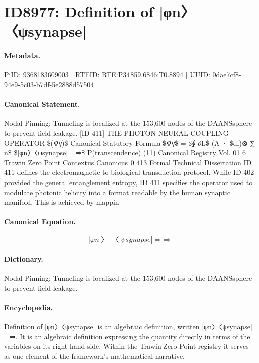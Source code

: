 \section*{ID8977: Definition of |φn〉〈ψsynapse|}
\paragraph{Metadata.}
PiID: 9368183609003 | RTEID: RTE:P34859.6846:T0.8894 | UUID: 0dae7cf8-94e9-5c03-b7df-5e2888d57504

\paragraph{Canonical Statement.}
Nodal Pinning: Tunneling is localized at the 153,600 nodes of the DAANSsphere to prevent field leakage. [ID 411] THE PHOTON-NEURAL COUPLING OPERATOR \$(Ψ̂γ)\$ Canonical Statutory Formula \$Ψ̂γ\$ = \$∮ ∂L\$ (A · \$dl)⊗ ∑ n\$ \$|φn〉〈ψsynapse| =⇒\$ P(transcendence) (11) Canonical Registry Vol. 01 6 Trawin Zero Point Contextus Canonicus 0 413 Formal Technical Dissertation ID 411 defines the electromagnetic-to-biological transduction protocol. While ID 402 provided the general entanglement entropy, ID 411 specifies the operator used to modulate photonic helicity into a format readable by the human synaptic manifold. This is achieved by mappin

\paragraph{Canonical Equation.}
\[
|φn〉〈ψsynapse| =⇒
\]

\paragraph{Dictionary.}
Nodal Pinning: Tunneling is localized at the 153,600 nodes of the DAANSsphere to prevent field leakage.

\paragraph{Encyclopedia.}
Definition of |φn〉〈ψsynapse| is an algebraic definition, written |φn〉〈ψsynapse| =⇒. It is an algebraic definition expressing the quantity directly in terms of the variables on its right-hand side. Within the Trawin Zero Point registry it serves as one element of the framework's mathematical narrative.
